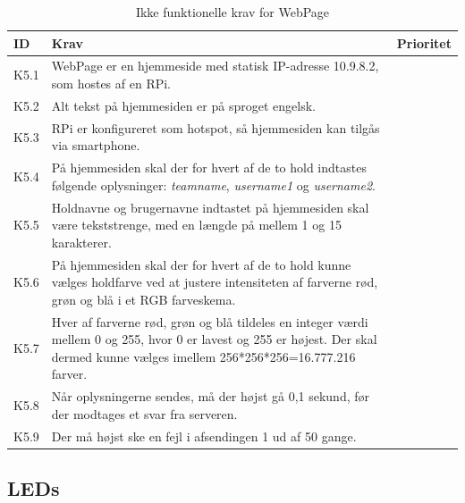 \documentclass[Kravspecifikation/Kravspec_Main.tex]{subfiles}
\begin{document}
\begin{table}[H]
\centering
\begin{tabular}{|L{0.1\textwidth}|L{0.65\textwidth}|L{0.15\textwidth}|}
\hline
\textbf{ID} & \textbf{Krav} & \textbf{Prioritet} \\ \hline
K5.1 & WebPage er en hjemmeside med statisk IP-adresse 10.9.8.2, som hostes af en RPi. & \\ \hline
K5.2 & Alt tekst på hjemmesiden er på sproget engelsk. & \\ \hline
K5.3 & RPi er konfigureret som hotspot, så hjemmesiden kan tilgås via smartphone. & \\ \hline
K5.4 & På hjemmesiden skal der for hvert af de to hold indtastes følgende oplysninger: \textit{teamname}, \textit{username1} og \textit{username2}. & \\ \hline
K5.5 & Holdnavne og brugernavne indtastet på hjemmesiden skal være tekststrenge, med en længde på mellem 1 og 15 karakterer. & \\ \hline
K5.6 & På hjemmesiden skal der for hvert af de to hold kunne vælges holdfarve ved at justere intensiteten af farverne rød, grøn og blå i et RGB farveskema. & \\ \hline
K5.7 & Hver af farverne rød, grøn og blå tildeles en integer værdi mellem 0 og 255, hvor 0 er lavest og 255 er højest. Der skal dermed kunne vælges imellem 256*256*256=16.777.216 farver.  & \\ \hline
K5.8 & Når oplysningerne sendes, må der højst gå 0,1 sekund, før der modtages et svar fra serveren. & \\ \hline
K5.9 & Der må højst ske en fejl i afsendingen 1 ud af 50 gange. & \\ \hline
\end{tabular}
\caption{Ikke funktionelle krav for WebPage}
\label{tab:WebPage}
\end{table}

\subsection{LEDs}
\end{document}
